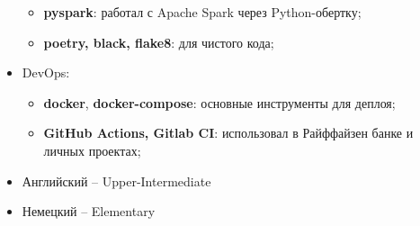 \begin{itemize}
\begin{itemize}
            \item \textbf{pyspark}: работал с Apache Spark через Python-обертку;
            \item \textbf{poetry, black, flake8}: для чистого кода;
        \end{itemize}
    \item DevOps:
        \begin{itemize}
            \item \textbf{docker}, \textbf{docker-compose}: основные инструменты для деплоя;
            \item \textbf{GitHub Actions, Gitlab CI}: использовал в Райффайзен банке и личных проектах;
        \end{itemize}
\end{itemize}








\begin{itemize}
	\item Английский -- Upper-Intermediate
    \item Немецкий -- Elementary
\end{itemize}

